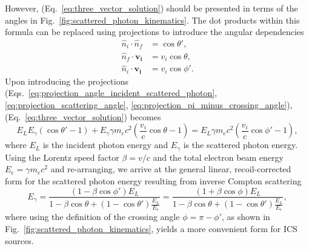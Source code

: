 \documentclass[../main.tex]{subfiles}
\begin{document}
However, (Eq.~\ref{eq:three_vector_solution}) should be presented in terms of the angles in Fig.~\ref{fig:scattered_photon_kinematics}. The dot products within this formula can be replaced using projections to introduce the angular dependencies
\begin{align}
\hat{n}_{i}\cdot\hat{n}_{f} &= \cos\theta',
\label{eq:projection_angle_incident_scattered_photon}\\
\hat{n}_{f}\cdot \boldsymbol{v_{i}} &= v_{i}\cos\theta,
\label{eq:projection_scattering_angle}\\
\hat{n}_{i}\cdot \boldsymbol{v_{i}} &= v_{i}\cos\phi'.
\label{eq:projection_pi_minus_crossing_angle}
\end{align}
Upon introducing the projections (Eqs.~\ref{eq:projection_angle_incident_scattered_photon}, \ref{eq:projection_scattering_angle}, \ref{eq:projection_pi_minus_crossing_angle}), (Eq.~\ref{eq:three_vector_solution}) becomes
\begin{equation}
E_{L}E_{\gamma}\left(\cos\theta'-1\right)+E_{\gamma}\gamma m_{e}c^{2}\left(\frac{v_{i}}{c}\cos\theta-1\right) = E_{L}\gamma m_{e}c^{2}\left( \frac{v_{i}}{c}\cos\phi'-1\right),
\label{eq:three_vector_solution_projections}
\end{equation}
where $E_{L}$ is the incident photon energy and $E_{\gamma}$ is the scattered photon energy. Using the Lorentz speed factor $\beta = v/c$ and the total electron beam energy $E_{e} = \gamma m_{e}c^{2}$ and re-arranging, we arrive at the general linear, recoil-corrected form for the scattered photon energy resulting from inverse Compton scattering 
\begin{equation}
E_{\gamma} = \frac{\left(1-\beta\cos\phi'\right)E_{L}}{1-\beta\cos\theta+\left(1-\cos\theta'\right)\frac{E_{L}}{E_{e}}} = \frac{\left(1+\beta\cos\phi\right)E_{L}}{1-\beta\cos\theta+\left(1-\cos\theta'\right)\frac{E_{L}}{E_{e}}},
\label{eq:scattered_photon_energy}
\end{equation}
where using the definition of the crossing angle $\phi=\pi-\phi'$, as shown in Fig.~\ref{fig:scattered_photon_kinematics}, yields a more convenient form for ICS sources.   
  
\end{document}
